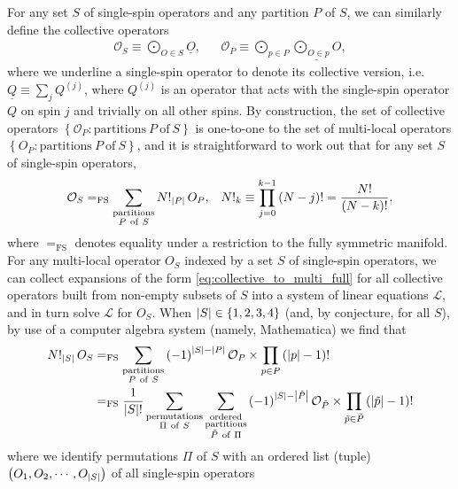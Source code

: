 \documentclass[nofootinbib,notitlepage,11pt]{revtex4-2}
\renewcommand{\t}{\text} %
\newcommand{\f}[2]{\dfrac{#1}{#2}} %
\newcommand{\p}[1]{\left(#1\right)} %
\renewcommand{\set}[1]{\left\{#1\right\}} %
\newcommand{\1}{\mathds{1}}
\renewcommand{\L}{\mathcal{L}}
\renewcommand{\O}{\mathcal{O}}
\renewcommand{\P}{\mathcal{P}}
\newcommand{\EQFS}{=_{\text{FS}}}
\newcommand{\col}{\underline}
\begin{document}
For any set $S$ of single-spin operators and any partition $P$ of $S$,
we can similarly define the collective operators
\begin{align}
  \O_S \equiv \bigodot_{O\in S} \col{O},
  &&
  \O_P \equiv \bigodot_{p\in P} \col{\textstyle\bigodot_{O\in p} O},
\end{align}
where we underline a single-spin operator to denote its collective
version, i.e.~$\col{Q}\equiv\sum_j Q^{(j)}$, where $Q^{(j)}$ is an
operator that acts with the single-spin operator $Q$ on spin $j$ and
trivially on all other spins.  By construction, the set of collective
operators $\set{\O_P:\t{partitions}~P~\t{of}~S}$ is one-to-one to the
set of multi-local operators $\set{O_P:\t{partitions}~P~\t{of}~S}$,
and it is straightforward to work out that for any set $S$ of
single-spin operators,
\begin{align}
  \O_S
  \EQFS \sum_{\substack{\t{partitions}\\P~\t{of}~S}}
  N!_{\abs{P}}\, O_P,
  &&
  N!_k \equiv \prod_{j=0}^{k-1}\p{N-j}! = \f{N!}{\p{N-k}!},
  \label{eq:collective_to_multi_full}
\end{align}
where $\EQFS$ denotes equality under a restriction to the fully
symmetric manifold.  For any multi-local operator $O_S$ indexed by a
set $S$ of single-spin operators, we can collect expansions of the
form \eqref{eq:collective_to_multi_full} for all collective operators
built from non-empty subsets of $S$ into a system of linear equations
$\L$, and in turn solve $\L$ for $O_S$.  When
$\abs{S}\in\set{1,2,3,4}$ (and, by conjecture, for all $S$), by use of
a computer algebra system (namely, Mathematica) we find that
\begin{align}
  N!_{\abs{S}}\, O_S
  &\EQFS \sum_{\substack{\t{partitions}\\P~\t{of}~S}}
  \p{-1}^{\abs{S}-\abs{P}} \O_P \times \prod_{p\in P}\p{\abs{p}-1}!
  \label{eq:multi_to_collective_full} \\
  &\EQFS \f1{\abs{S}!} \sum_{\substack{\t{permutations}\\\Pi~\t{of}~S}}
  \sum_{\substack{\t{ordered}\\\t{partitions}\\\tilde P~\t{of}~\Pi}}
  \p{-1}^{\abs{S}-\abs{\tilde P}} \O_{\tilde P}
  \times \prod_{\tilde p\in\tilde P} \p{\abs{\tilde p}-1}!
  \label{eq:multi_to_collective_full_simp}
\end{align}
where we identify permutations $\Pi$ of $S$ with an ordered list
(tuple) $\p{O_1,O_2,\cdots,O_{\abs{S}}}$ of all single-spin operators
\end{document}
